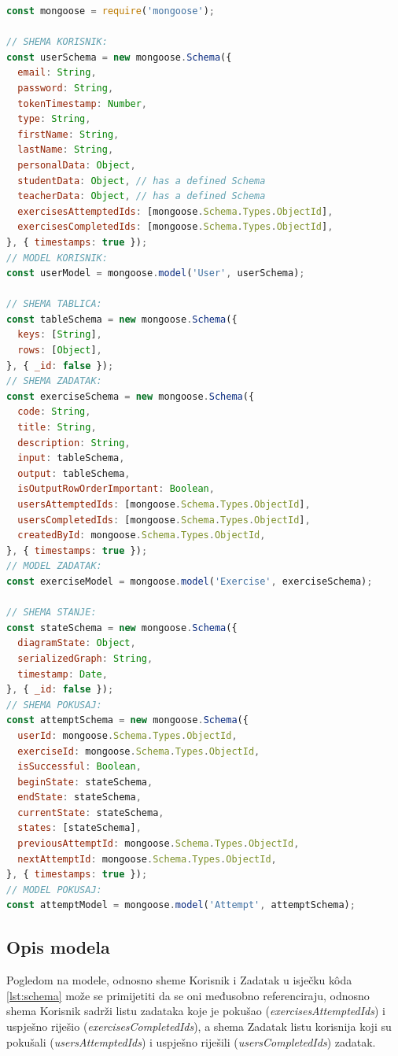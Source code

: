 \documentclass[times, utf8, diplomski, numeric]{fer}
\newcommand{\razmakp}{\vspace{18pt}}
\newcommand{\razmaks}{\vspace{10pt}}
\begin{document}
\razmakp %
\begin{lstlisting}[language=JavaScript, caption={Pojednostavljena verzija podatkovnih modela, odnosno Mongoose shema dokumenata spremljenih u Mongo bazi}, label={lst:schema}]
const mongoose = require('mongoose');

// SHEMA KORISNIK:
const userSchema = new mongoose.Schema({
  email: String,
  password: String,
  tokenTimestamp: Number,
  type: String,
  firstName: String,
  lastName: String,
  personalData: Object,
  studentData: Object, // has a defined Schema
  teacherData: Object, // has a defined Schema
  exercisesAttemptedIds: [mongoose.Schema.Types.ObjectId],
  exercisesCompletedIds: [mongoose.Schema.Types.ObjectId],
}, { timestamps: true });
// MODEL KORISNIK:
const userModel = mongoose.model('User', userSchema);

// SHEMA TABLICA:
const tableSchema = new mongoose.Schema({
  keys: [String],
  rows: [Object],
}, { _id: false });
// SHEMA ZADATAK:
const exerciseSchema = new mongoose.Schema({
  code: String,
  title: String,
  description: String,
  input: tableSchema,
  output: tableSchema,
  isOutputRowOrderImportant: Boolean,
  usersAttemptedIds: [mongoose.Schema.Types.ObjectId],
  usersCompletedIds: [mongoose.Schema.Types.ObjectId],
  createdById: mongoose.Schema.Types.ObjectId,
}, { timestamps: true });
// MODEL ZADATAK:
const exerciseModel = mongoose.model('Exercise', exerciseSchema);

// SHEMA STANJE:
const stateSchema = new mongoose.Schema({
  diagramState: Object,
  serializedGraph: String,
  timestamp: Date,
}, { _id: false });
// SHEMA POKUSAJ:
const attemptSchema = new mongoose.Schema({
  userId: mongoose.Schema.Types.ObjectId,
  exerciseId: mongoose.Schema.Types.ObjectId,
  isSuccessful: Boolean,
  beginState: stateSchema,
  endState: stateSchema,
  currentState: stateSchema,
  states: [stateSchema],
  previousAttemptId: mongoose.Schema.Types.ObjectId,
  nextAttemptId: mongoose.Schema.Types.ObjectId,
}, { timestamps: true });
// MODEL POKUSAJ:
const attemptModel = mongoose.model('Attempt', attemptSchema);
\end{lstlisting}
\razmaks

\subsection{Opis modela}

Pogledom na modele, odnosno sheme Korisnik i Zadatak u isječku kôda \ref{lst:schema} može se primijetiti da se oni međusobno referenciraju, odnosno shema Korisnik sadrži listu zadataka koje je pokušao (\emph{exercisesAttemptedIds}) i uspješno riješio (\emph{exercisesCompletedIds}), a shema Zadatak listu korisnija koji su pokušali (\emph{usersAttemptedIds}) i uspješno riješili (\emph{usersCompletedIds}) zadatak.
\end{document}
